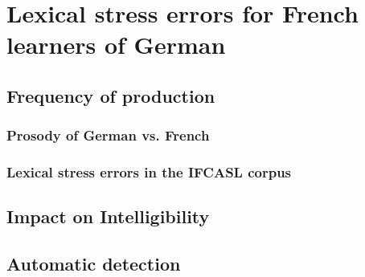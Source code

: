 %
%

\chapter{Lexical stress errors for French learners of German}


\blindtext
\section{Frequency of production}
	\subsection{Prosody of German vs. French }
	\subsection{Lexical stress errors in the IFCASL corpus} 
\section{Impact on Intelligibility}
\section{Automatic detection}